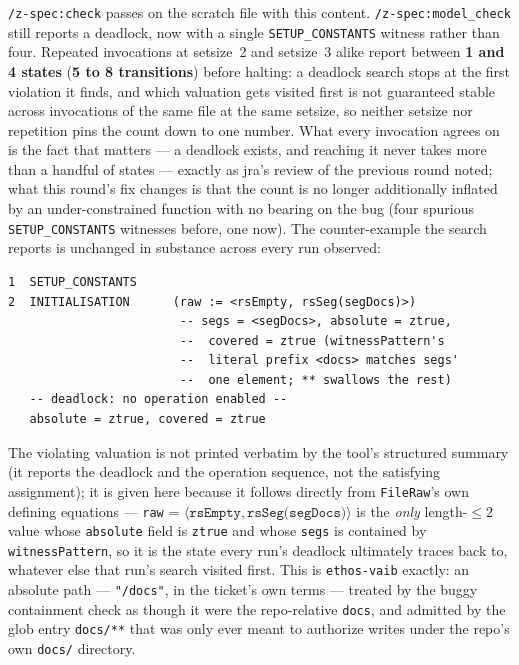 \documentclass[a4paper,10pt,fleqn]{article}
\newcommand{\field}[1]{\texttt{#1}}
\begin{document}
\texttt{/z-spec:check} passes on the scratch file with this content.
\texttt{/z-spec:model\_check} still reports a deadlock, now with a
single \texttt{SETUP\_CONSTANTS} witness rather than four. Repeated
invocations at setsize~2 and setsize~3 alike report between
\textbf{1 and 4 states} (\textbf{5 to 8 transitions}) before halting:
a deadlock search stops at the first violation it finds, and which
valuation gets visited first is not guaranteed stable across
invocations of the same file at the same setsize, so neither setsize
nor repetition pins the count down to one number. What every
invocation agrees on is the fact that matters --- a deadlock exists,
and reaching it never takes more than a handful of states --- exactly
as jra's review of the previous round noted; what this round's fix
changes is that the count is no longer additionally inflated by an
under-constrained function with no bearing on the bug (four spurious
\texttt{SETUP\_CONSTANTS} witnesses before, one now). The
counter-example the search reports is unchanged in substance across
every run observed:

\begin{verbatim}
1  SETUP_CONSTANTS
2  INITIALISATION      (raw := <rsEmpty, rsSeg(segDocs)>)
                        -- segs = <segDocs>, absolute = ztrue,
                        --  covered = ztrue (witnessPattern's
                        --  literal prefix <docs> matches segs'
                        --  one element; ** swallows the rest)
   -- deadlock: no operation enabled --
   absolute = ztrue, covered = ztrue
\end{verbatim}

The violating valuation is not printed verbatim by the tool's
structured summary (it reports the deadlock and the operation
sequence, not the satisfying assignment); it is given here because it
follows directly from \field{FileRaw}'s own defining equations ---
\field{raw} = $\langle \field{rsEmpty}, \field{rsSeg(segDocs)} \rangle$
is the \emph{only} length-$\leq 2$ value whose \field{absolute} field
is \field{ztrue} and whose \field{segs} is contained by
\field{witnessPattern}, so it is the state every run's deadlock
ultimately traces back to, whatever else that run's search visited
first. This is \field{ethos-vaib} exactly: an absolute path ---
\texttt{"/docs"}, in the ticket's own terms --- treated by the buggy
containment check as though it were the repo-relative \texttt{docs},
and admitted by the glob entry \texttt{docs/**} that was only ever
meant to authorize writes under the repo's own \texttt{docs/}
directory.
\end{document}
